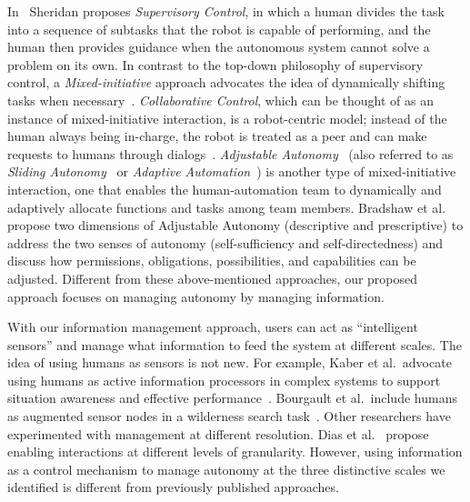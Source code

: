 In~\cite{Sheridan1992Telerobotics} Sheridan proposes \textit{Supervisory Control}, in which a human divides the task into a sequence of subtasks that the robot is capable of performing, and the human then provides guidance when the autonomous system cannot solve a problem on its own. In contrast to the top-down philosophy of supervisory control, a \textit{Mixed-initiative} approach advocates the idea of dynamically shifting tasks when necessary~\cite{Hearst1999Mixed}. \textit{Collaborative Control}, which can be thought of as an instance of mixed-initiative interaction, is a robot-centric model; instead of the human always being in-charge, the robot is treated as a peer and can make requests to humans through dialogs~\cite{Fong1999Collaborative}. \textit{Adjustable Autonomy}~\cite{Dorais2001Designing} (also referred to as \textit{Sliding Autonomy}~\cite{Dias2008SlidingAutonomy} or \textit{Adaptive Automation}~\cite{Rouse1988Adaptive}) is another type of mixed-initiative interaction, one that enables the human-automation team to dynamically and adaptively allocate functions and tasks among team members. Bradshaw et al.\ \cite{Bradshaw2004Dimensions} propose two dimensions of Adjustable Autonomy (descriptive  and prescriptive) to address the two senses of autonomy (self-sufficiency and self-directedness) and discuss how permissions, obligations, possibilities, and capabilities can be adjusted. Different from these above-mentioned approaches, our proposed approach focuses on managing autonomy by managing information.

With our information management approach, users can act as ``intelligent sensors'' and manage what information to feed the system at different scales. The idea of using humans as sensors is not new. For example, Kaber et al.\ advocate using humans as active information processors in complex systems to support situation awareness and effective performance~\cite{Kaber2001Design}. Bourgault et al.\ include humans as augmented sensor nodes in a wilderness search task~\cite{Bourgault2008AugmentedNodes}. Other researchers have experimented with management at different resolution. Dias et al.\ \cite{Dias2008SlidingAutonomy} propose enabling interactions at different levels of granularity. However, using information as a control mechanism to manage autonomy at the three distinctive scales we identified is different from previously published approaches.

